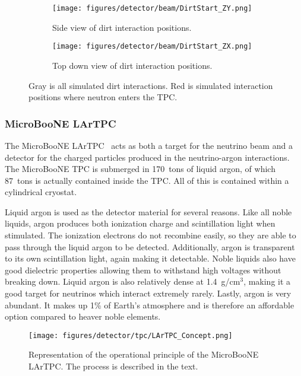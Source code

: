     \begin{figure}[h]
      \centering
      \begin{subfigure}{2.5in}
        \texttt{[image: figures/detector/beam/DirtStart\_ZY.png]}
        \caption{Side view of dirt interaction positions.}
      \end{subfigure}
      \hspace{2pt}
      \begin{subfigure}{2.5in}
        \texttt{[image: figures/detector/beam/DirtStart\_ZX.png]}
        \caption{Top down view of dirt interaction positions.}
      \end{subfigure}
      \caption{Gray is all simulated dirt interactions. Red is simulated
      interaction positions where neutron enters the TPC.}
      \label{fig:dirtstart}
    \end{figure}

  \subsubsection{MicroBooNE LArTPC}\label{sec:lartpc}
    The MicroBooNE LArTPC~\cite{detector} acts as both a target for the
    neutrino beam and a detector for the charged particles produced in the
    neutrino-argon interactions. The MicroBooNE TPC is submerged in 170~tons of
    liquid argon, of which 87~tons is actually contained inside the TPC. All of
    this is contained within a cylindrical cryostat.
    
    Liquid argon is used as the detector material for several reasons. Like all
    noble liquids, argon produces both ionization charge and scintillation
    light when stimulated.  The ionization electrons do not recombine easily,
    so they are able to pass through the liquid argon to be detected.
    Additionally, argon is transparent to its own scintillation light, again
    making it detectable. Noble liquids also have good dielectric properties
    allowing them to withstand high voltages without breaking down. Liquid
    argon is also relatively dense at 1.4~g/cm$^3$, making it a good target for
    neutrinos which interact extremely rarely. Lastly, argon is very abundant.
    It makes up 1\% of Earth's atmosphere and is therefore an affordable option
    compared to heaver noble elements.

    \begin{figure}[h]
      \centering
      \texttt{[image: figures/detector/tpc/LArTPC\_Concept.png]}
      \caption{Representation of the operational principle of the MicroBooNE
      LArTPC. The process is described in the text.}
      \label{fig:tpccartoon}
    \end{figure}


